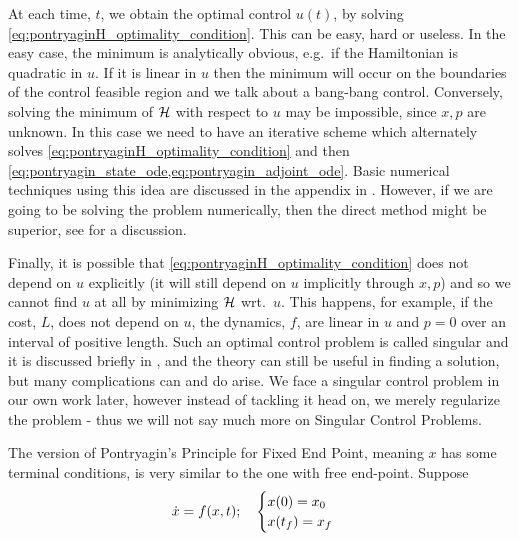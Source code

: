 At each time, $t$, we obtain the optimal control $u(t)$, by solving
\cref{eq:pontryaginH_optimality_condition}. This can be easy, hard or useless.
In the easy case, the minimum is analytically obvious, e.g.\ if the Hamiltonian
is quadratic in $u$. If it is linear in $u$ then the minimum will occur on the
boundaries of the control feasible region and we talk about a bang-bang
control. Conversely, solving the minimum of ${ \mathcal{H} }$ with respect to $u$ may be impossible,
since $x,p$ are unknown. In this case we need to have an iterative scheme which
alternately solves
\cref{eq:pontryaginH_optimality_condition} 
and then \cref{eq:pontryagin_state_ode,eq:pontryagin_adjoint_ode}. Basic
numerical techniques using this idea are discussed in the appendix in
\cite{Kirk2004}. However, if we are going to be solving the problem numerically,
then the direct method might be superior, see \cite{Ross2005} for a discussion.
 
Finally, it is possible that \cref{eq:pontryaginH_optimality_condition} does not
depend on $u$ explicitly (it will still depend  on $u$ implicitly through $x,p$)
and so we cannot find $u$ at all by minimizing ${ \mathcal{H} }$ wrt.\ $u$. This happens, for
example, if the cost, $L$, does not depend on $u$, the dynamics, $f$, are linear
in $u$ and $p=0$ over an interval of positive length. Such an optimal control
problem is called singular and it is discussed briefly in \cite{Kirk2004}, and
the theory can still be useful in finding a solution, but many complications can
and do arise. We face a singular control problem in our own work later, however
instead of tackling it head on, we merely regularize the problem - thus we will
not say much more on Singular Control Problems.

The version of Pontryagin's Principle for Fixed End Point, meaning $x$ has some
terminal conditions, is very similar to the one with free end-point. Suppose 
\begin{equation}
\dot{x} = f(x,t); 
\quad
\begin{cases}
x(0) = x_0
\\
x({ t_f }) = x_f
\end{cases}
\label{eq:generic_dynamics_deterministic_fixed_end_point}
\end{equation}

